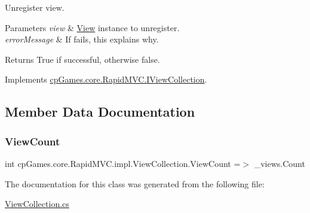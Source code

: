 Unregister view. 


\begin{DoxyParams}{Parameters}
{\em view} & \mbox{\hyperlink{classcp_games_1_1core_1_1_rapid_m_v_c_1_1_view}{View}} instance to unregister.\\
\hline
{\em error\+Message} & If fails, this explains why.\\
\hline
\end{DoxyParams}
\begin{DoxyReturn}{Returns}
True if successful, otherwise false.
\end{DoxyReturn}


Implements \mbox{\hyperlink{interfacecp_games_1_1core_1_1_rapid_m_v_c_1_1_i_view_collection_acc10b801eec02af0165b9e558a915682}{cp\+Games.\+core.\+Rapid\+M\+V\+C.\+I\+View\+Collection}}.



\subsection{Member Data Documentation}
\mbox{\label{classcp_games_1_1core_1_1_rapid_m_v_c_1_1impl_1_1_view_collection_afb84f20b6b350eb1895cedc198b37efc}} 
\subsubsection{\texorpdfstring{ViewCount}{ViewCount}}
{\footnotesize\ttfamily int cp\+Games.\+core.\+Rapid\+M\+V\+C.\+impl.\+View\+Collection.\+View\+Count =$>$ \+\_\+views.\+Count}



The documentation for this class was generated from the following file\+:\begin{DoxyCompactItemize}
\item 
\mbox{\hyperlink{_view_collection_8cs}{View\+Collection.\+cs}}\end{DoxyCompactItemize}
